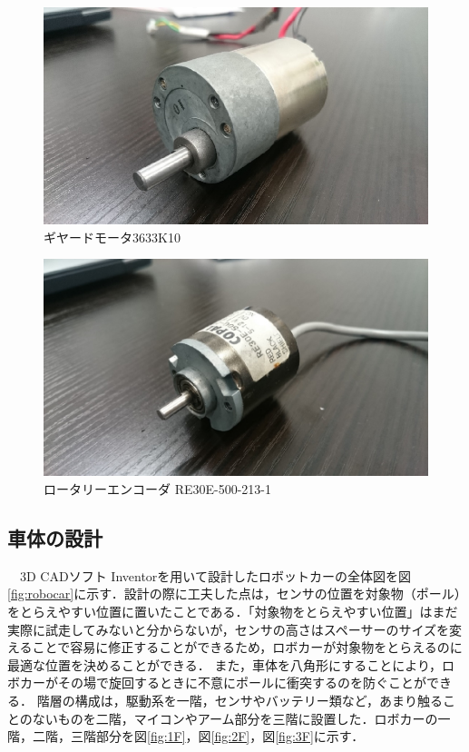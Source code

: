 \documentclass[10pt,a4j]{jarticle}
\begin{document}
\begin{figure}[H]
 \begin{center}
  \includegraphics[scale=.7]{./picture/picture2.eps}
  \caption{ギヤードモータ3633K10}
 \end{center}
\end{figure}

\begin{figure}[H]
 \begin{center}
  \includegraphics[scale=.7]{./picture/picture3.eps}
  \caption{ロータリーエンコーダ RE30E-500-213-1}
 \end{center}
\end{figure}



\subsection{車体の設計}
　3D CADソフト Inventorを用いて設計したロボットカーの全体図を図\ref{fig:robocar}に示す．設計の際に工夫した点は，センサの位置を対象物（ポール）をとらえやすい位置に置いたことである．「対象物をとらえやすい位置」はまだ実際に試走してみないと分からないが，センサの高さはスペーサーのサイズを変えることで容易に修正することができるため，ロボカーが対象物をとらえるのに最適な位置を決めることができる．
また，車体を八角形にすることにより，ロボカーがその場で旋回するときに不意にポールに衝突するのを防ぐことができる．
階層の構成は，駆動系を一階，センサやバッテリー類など，あまり触ることのないものを二階，マイコンやアーム部分を三階に設置した．ロボカーの一階，二階，三階部分を図\ref{fig:1F}，図\ref{fig:2F}，図\ref{fig:3F}に示す．
\end{document}
